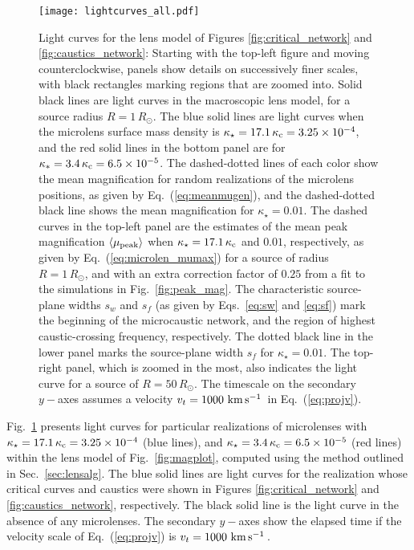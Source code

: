 \documentclass{aastex6}
\newcommand{\refeq}[1]{Eq.~(\ref{eq:#1})}
\newcommand{\reffig}[1]{Fig.~\ref{fig:#1}}
\newcommand{\refsec}[1]{Sec.~\ref{sec:#1}}
\def\kms{\, {\rm km}\, {\rm s}^{-1}\, }
\begin{document}
\begin{figure}[t]
\begin{center}
  \texttt{[image: lightcurves\_all.pdf]}
\caption{\label{fig:lightcurves} Light curves for the lens model of Figures \ref{fig:critical_network} and \ref{fig:caustics_network}: Starting with the top-left figure and moving counterclockwise, panels show details on successively finer scales, with black rectangles marking regions that are zoomed into. Solid black lines are light curves in the macroscopic lens model, for a source radius $R = 1\, R_{\odot}$. The {\color{mlabblue} blue} solid lines are light curves when the microlens surface mass density is $\kappa_\star = 17.1\, \kappa_{\rm c} = 3.25 \times 10^{-4}$, and the {\color{mlabred} red} solid lines in the bottom panel are for $\kappa_* = 3.4\, \kappa_{\rm c} = 6.5 \times 10^{-5}$. The dashed-dotted lines of each color show the mean magnification for random realizations of the microlens positions, as given by \refeq{meanmugen}, and the dashed-dotted black line shows the mean magnification for $\kappa_\star = 0.01$. The dashed curves in the top-left panel are the estimates of the mean peak magnification $\langle \mu_{\rm peak} \rangle$ when $\kappa_\star = 17.1 \, \kappa_{\rm c}$ and $0.01$, respectively, as given by \refeq{microlen_mumax} for a source of radius $R = 1\, R_{\odot}$, and with an extra correction factor of $0.25$ from a fit to the simulations in \reffig{peak_mag}. The characteristic source-plane widths $s_w$ and $s_f$ (as given by Eqs.~\eqref{eq:sw} and \eqref{eq:sf}) mark the beginning of the microcaustic network, and the region of highest caustic-crossing frequency, respectively. The dotted black line in the lower panel marks the source-plane width $s_f$ for $\kappa_\star = 0.01$. The top-right panel, which is zoomed in the most, also indicates the light curve for a source of $R=50\, R_{\odot}$. The timescale on the secondary $y-$axes assumes a velocity $v_t = 1000 \, \kms$ in \refeq{projv}.}
\end{center}
\end{figure}

\reffig{lightcurves} presents light curves for particular realizations of microlenses with $\kappa_\star = 17.1\, \kappa_{\rm c} = 3.25 \times 10^{-4}$ (blue lines), and $\kappa_\star = 3.4\, \kappa_{\rm c} = 6.5 \times 10^{-5}$ (red lines) within the lens model of \reffig{magplot}, computed using the method outlined in \refsec{lensalg}. The blue solid lines are light curves for the realization whose critical curves and caustics were shown in Figures \ref{fig:critical_network} and \ref{fig:caustics_network}, respectively. The black solid line is the light curve in the absence of any microlenses. The secondary $y-$axes show the elapsed time if the velocity scale of \refeq{projv} is $v_t = 1000 \, \kms$. 
\end{document}
